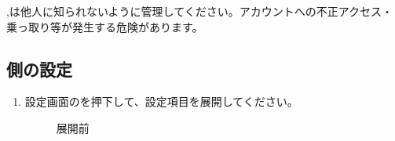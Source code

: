             \begin{itembox}[c]{}
                \texttt\clientId ,\clientSecret は他人に知られないように管理してください。アカウントへの不正アクセス・乗っ取り等が発生する危険があります。
            \end{itembox}

    \newpage
    \subsection{\bj 側の設定}
    \label{sec:spotify6}
        \begin{enumerate}
            \item 設定画面のを押下して、設定項目を展開してください。
                \begin{figure}[htbp]
                    \begin{minipage}[b]{0.45\linewidth}
                        \centering
                        \caption{展開前}
                        \label{img:spotify10}
                    \end{minipage}
                    \begin{minipage}[b]{0.45\linewidth}
                        \centering
                        \fbox{
}
\end{minipage}
\end{figure}
\end{enumerate}

